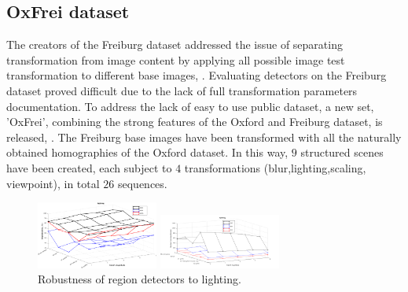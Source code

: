 \documentclass{article}
\begin{document}
 
\subsection{OxFrei dataset}
\label{ssec:combined}
The creators of the Freiburg dataset addressed the issue of separating transformation from image content by applying all possible image test transformation to different base images, \cite{FischerDB14}. Evaluating detectors on the Freiburg dataset proved difficult due to the lack of full transformation parameters documentation. To address the lack of easy to use public dataset, a new set, 'OxFrei', combining the strong features of the Oxford and Freiburg dataset, is released, \cite{git_repo}. The Freiburg base images have been transformed with all the naturally obtained homographies of the Oxford dataset. In this way, $9$ structured scenes have been created, each subject to $4$ transformations (blur,lighting,scaling, viewpoint), in total $26$ sequences.
\begin{figure}[htb]

\begin{minipage}[b]{.49\linewidth}
  \centering
  \centerline{\includegraphics[width=4.0cm]{./Figs/lighting_some_combined}}
\end{minipage}
\hfill
\begin{minipage}[b]{0.49\linewidth}
  \centering
  \centerline{\includegraphics[width=4.0cm]{./Figs/lighting_some_combined_numreg}}
\end{minipage}
\vspace{-0.25cm}
\caption{Robustness of region detectors to lighting.}
\label{fig:ligthing}
%
\end{figure}
\vspace{-0.5cm}
\end{document}
